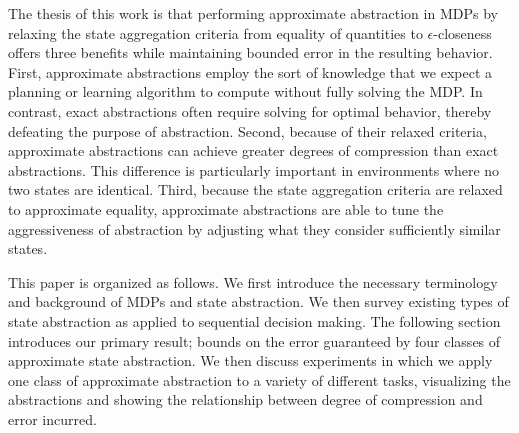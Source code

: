 The thesis of this work is that performing approximate abstraction in \acp{MDP} by relaxing the state aggregation criteria from equality of quantities to $\epsilon$-closeness offers three benefits while maintaining bounded error in the resulting behavior. First, approximate abstractions employ the sort of knowledge that we expect a planning or learning algorithm to compute without fully solving the \ac{MDP}. In contrast, exact abstractions often require solving for optimal behavior, thereby defeating the purpose of abstraction. Second, because of their relaxed criteria, approximate abstractions can achieve greater degrees of compression than exact abstractions. This difference is particularly important in environments where no two states are identical.  Third, because the state aggregation criteria are relaxed to approximate equality, approximate abstractions are able to tune the aggressiveness of abstraction by adjusting what they consider sufficiently similar states. 

This paper is organized as follows. We first introduce the necessary terminology and background of \acp{MDP} and state abstraction. We then survey existing types of state abstraction as applied to sequential decision making. The following section introduces our primary result; bounds on the error guaranteed by four classes of approximate state abstraction. We then discuss experiments in which we apply one class of approximate abstraction to a variety of different tasks, visualizing the abstractions and showing the relationship between degree of compression and error incurred.
